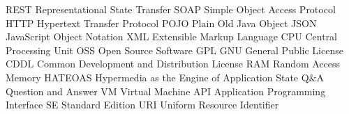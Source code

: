 		{REST}		{Representational State Transfer}
		{SOAP}		{Simple Object Access Protocol}
		{HTTP}		{Hypertext Transfer Protocol}
		{POJO}		{Plain Old Java Object}
		{JSON}		{JavaScript Object Notation}
		{XML}		{Extensible Markup Language}
		{CPU}		{Central Processing Unit}
		{OSS}		{Open Source Software}
		{GPL}		{GNU General Public License}
		{CDDL}		{Common Development and Distribution License}
		{RAM}		{Random Access Memory}
	{HATEOAS}	{Hypermedia as the Engine of Application State}
		{Q\&A}		{Question and Answer}
		{VM}		{Virtual Machine}
		{API}		{Application Programming Interface}
		{SE}		{Standard Edition}
		{URI}		{Uniform Resource Identifier}

